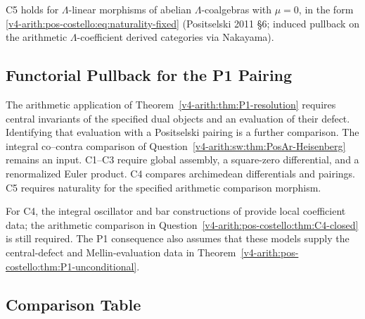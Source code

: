 C5 holds for \(\Lambda\)-linear morphisms of abelian
\(\Lambda\)-coalgebras with \(\mu=0\), in the form
\eqref{v4-arith:pos-costello:eq:naturality-fixed}
(Positselski 2011 \S6; induced pullback on the arithmetic
\(\Lambda\)-coefficient derived categories via Nakayama).

\subsection{Functorial Pullback for the P1 Pairing}

The arithmetic application of
Theorem~\ref{v4-arith:thm:P1-resolution} requires central invariants
of the specified dual objects and an evaluation of their defect.
Identifying that evaluation with a Positselski pairing is a further
comparison.
The integral co--contra comparison of
Question~\ref{v4-arith:sw:thm:PosAr-Heisenberg} remains an input.
C1--C3 require global assembly, a square-zero differential, and
a renormalized Euler product. C4 compares archimedean differentials
and pairings. C5 requires naturality for the specified arithmetic
comparison morphism.

For C4, the integral oscillator and bar constructions of
 provide local coefficient data;
the arithmetic comparison in
Question~\ref{v4-arith:pos-costello:thm:C4-closed} is still required.
The P1 consequence also assumes that these models supply the
central-defect and Mellin-evaluation data in
Theorem~\ref{v4-arith:pos-costello:thm:P1-unconditional}.

\subsection{Comparison Table}


